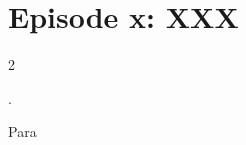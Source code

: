 \section{Episode x: XXX}

\begin{multicols}{2}

.\medskip

Para \medskip




\end{multicols}

%

\clearpage